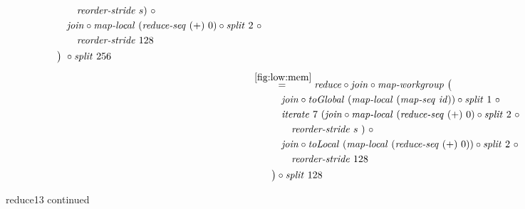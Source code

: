 \begin{figure*}[t]
\begin{align*}
\begin{aligned}
    &\qquad\qquad \reorderStride\ s)\ \circ\\
    &\qquad\quad\join \circ \mapLocal\ (\reduceSeq\ (+)\ 0) \circ \splitN\ 2\ \circ\\
    &\qquad\qquad\reorderStride\ 128\\
    &\qquad\big)\ \circ \splitN\ 256
  \end{aligned}\\[.5em]
%
  &\hspace{-2em}\quad\begin{aligned}
    &\overset{\ref{fig:low:mem}}{=\hspace{.2em}}
      \reduce \circ \join \circ \mapWorkgroup\ \big(\\
    &\qquad\quad\join \circ \toGlobal\ (\mapLocal\ (\mapSeq\ \id)) \circ \splitN\ 1\ \circ\\
    &\qquad\quad\iterateN\ 7\ (\join \circ \mapLocal\ (\reduceSeq\ (+)\ 0) \circ \splitN\ 2\ \circ\\
    &\qquad\qquad \reorderStride\ s\ )\ \circ\\
    &\qquad\quad\join \circ \toLocal\ (\mapLocal\ (\reduceSeq\ (+)\ 0)) \circ \splitN\ 2\ \circ\\
    &\qquad\qquad\reorderStride\ 128\\
    &\qquad\big) \circ \splitN\ 128
  \end{aligned}
%  
\end{align*}
\caption{reduce13 continued}
\end{figure*}

